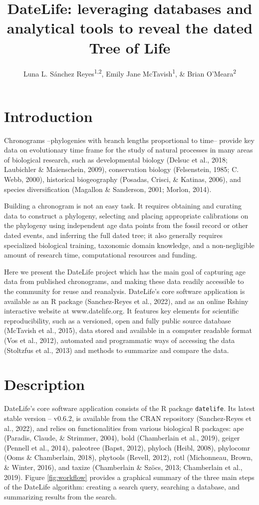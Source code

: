 \documentclass[
  english,
  man]{apa6}
\title{DateLife: leveraging databases and analytical tools to reveal the dated Tree of Life}
\author{Luna L. Sánchez Reyes\textsuperscript{1,2}, Emily Jane McTavish\textsuperscript{1}, \& Brian O'Meara\textsuperscript{2}}
\date{}
\affiliation{\vspace{0.5cm}\textsuperscript{1} University of California, Merced\\\textsuperscript{2} University of Tennessee, Knoxville}
\begin{document}
\maketitle

\hypertarget{introduction}{%
\section{Introduction}\label{introduction}}

Chronograms --phylogenies with branch lengths proportional to time-- provide key data on evolutionary time frame for the study of natural processes in many areas of biological research, such as developmental biology (Delsuc et al., 2018; Laubichler \& Maienschein, 2009), conservation biology (Felsenstein, 1985; C. Webb, 2000), historical biogeography (Posadas, Crisci, \& Katinas, 2006), and species diversification (Magallon \& Sanderson, 2001; Morlon, 2014).

Building a chronogram is not an easy task.
It requires obtaining and curating data to construct a phylogeny, selecting and placing appropriate calibrations on the phylogeny using independent age data points from the fossil record or other dated events, and inferring the full dated tree;
it also generally requires specialized biological training, taxonomic domain knowledge, and a non-negligible amount of research time, computational resources and funding.

Here we present the DateLife project which has the main goal of capturing age data from published chronograms, and making these data readily accessible to the community for reuse and reanalysis.
DateLife's core software application is available as an R package (Sanchez-Reyes et al., 2022), and as an online Rshiny interactive website at www.datelife.org. It features key elements for scientific reproducibility, such as a versioned, open and fully public source database (McTavish et al., 2015), data stored and available in a computer readable format (Vos et al., 2012), automated and programmatic ways of accessing the data (Stoltzfus et al., 2013) and methods to summarize and compare the data.

\hypertarget{description}{%
\section{Description}\label{description}}

DateLife's core software application consists of the R package \texttt{datelife}. Its latest stable version -- v0.6.2, is available from the CRAN repository (Sanchez-Reyes et al., 2022), and relies on functionalities from various biological R packages:
ape (Paradis, Claude, \& Strimmer, 2004),
bold (Chamberlain et al., 2019),
geiger (Pennell et al., 2014),
paleotree (Bapst, 2012),
phyloch (Heibl, 2008),
phylocomr (Ooms \& Chamberlain, 2018),
phytools (Revell, 2012),
rotl (Michonneau, Brown, \& Winter, 2016), and
taxize (Chamberlain \& Szöcs, 2013; Chamberlain et al., 2019).
Figure \ref{fig:workflow} provides a graphical summary of the three main steps of the DateLife algorithm: creating a search query, searching a database, and summarizing results from the search.
\end{document}

